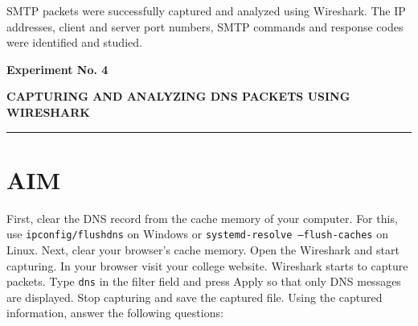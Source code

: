 \documentclass[12pt,a4paper]{article}
\newcommand{\experiment}[2]{
	\newpage
	
	\begin{center}
		\noindent
		\begin{minipage}{\textwidth}
			\centering
			{\textbf{\Large Experiment No. #1}}
			
			\vspace{1cm}
			
			\textbf{\Large #2}
		\end{minipage}
		
		\vspace{0.3cm}
		\noindent\rule{\textwidth}{0.6pt}
	\end{center}
}
\begin{document}
	SMTP packets were successfully captured and analyzed using Wireshark. The IP addresses, client and server port numbers, SMTP commands and response codes were identified and studied.
	
	
	
	\experiment{4}{CAPTURING AND ANALYZING DNS PACKETS USING WIRESHARK}
	
	\section*{AIM}
	First, clear the DNS record from the cache memory of your computer. For this, use \texttt{ipconfig/flushdns} on Windows or \texttt{systemd-resolve --flush-caches} on Linux. Next, clear your browser's cache memory. Open the Wireshark and start capturing. In your browser visit your college website. Wireshark starts to capture packets. Type \texttt{dns} in the filter field and press Apply so that only DNS messages are displayed. Stop capturing and save the captured file. Using the captured information, answer the following questions:
\end{document}

